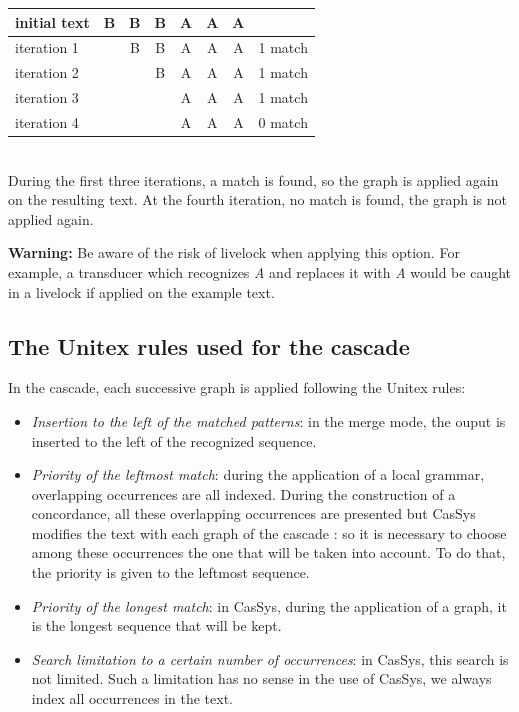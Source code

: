\begin{tabular}{|l|cccccc|r|}
\hline
initial text  &B&B&B&A&A&A&\\
\hline
iteration 1 & &B&B&A&A&A& 1 match\\
iteration 2 & & &B&A&A&A& 1 match\\
iteration 3 & & & &A&A&A& 1 match\\
iteration 4 & & & &A&A&A& 0 match\\
\hline
\end{tabular} \\

During the first three iterations, a match is found, so the graph is
applied again on the resulting text. At the fourth iteration, no match is
found, the graph is not applied again.

\textbf{Warning:} Be aware of the risk of livelock when applying this
option. For example, a transducer which recognizes \emph{A} and replaces it with
\emph{A} would be caught in a livelock if applied on the example text.

\subsection{The Unitex rules used for the cascade}

In the cascade, each successive graph is applied following the Unitex rules:
\begin{itemize}
	\item \textit{Insertion to the left of the matched patterns}: in the merge mode, the ouput is inserted to the left of the recognized sequence.
	\item	\textit{Priority of the leftmost match}: during the application of a local grammar, overlapping occurrences are all indexed. 
	During the construction of a concordance, all these overlapping occurrences are presented but CasSys modifies the text with each 
	graph of the cascade : so it is necessary to choose among these occurrences the one that will be taken into account. To do that, the priority is given to the leftmost sequence.
	\item \textit{Priority of the longest match}: in CasSys, during the application of a graph, it is the longest sequence 
	that will be kept.
	\item	\textit{Search limitation to a certain number of occurrences}: in CasSys, this search is not limited. Such a limitation has no sense in the use of CasSys, we always index all occurrences in the text.
\end{itemize}

